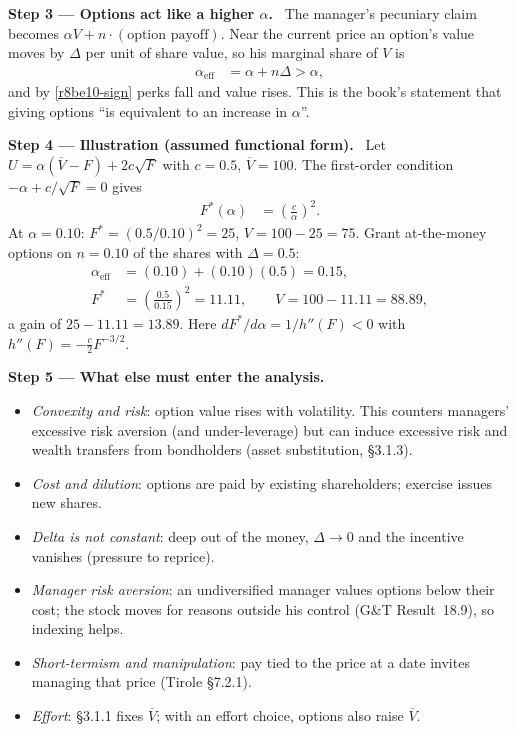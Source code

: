 \documentclass[11pt,a4paper]{article}
\newcommand{\step}[2]{\par\medskip\noindent\textbf{Step #1 --- #2.}~}
\begin{document}
\step{3}{Options act like a higher $\alpha$} The manager's pecuniary claim becomes $\alpha V + n\cdot(\text{option payoff})$. Near the current price an option's value moves by $\Delta$ per unit of share value, so his marginal share of $V$ is
\begin{align}
  \alpha_{\text{eff}} &= \alpha + n\Delta > \alpha, \label{r8be10-aeff}
\end{align}
and by \eqref{r8be10-sign} perks fall and value rises. This is the book's statement that giving options ``is equivalent to an increase in $\alpha$''.

\step{4}{Illustration (assumed functional form)} Let $U=\alpha(\overline V-F)+2c\sqrt F$ with $c=0.5$, $\overline V=100$. The first-order condition $-\alpha+c/\sqrt F=0$ gives
\begin{align}
  F^*(\alpha) &= \left(\frac{c}{\alpha}\right)^2. \label{r8be10-Fstar}
\end{align}
At $\alpha=0.10$: $F^*=(0.5/0.10)^2=25$, $V=100-25=75$. Grant at-the-money options on $n=0.10$ of the shares with $\Delta=0.5$:
\begin{align}
  \alpha_{\text{eff}} &= (0.10)+(0.10)(0.5) = 0.15, \nonumber\\
  F^* &= \left(\frac{0.5}{0.15}\right)^2 = 11.11, \qquad V = 100-11.11 = 88.89, \label{r8be10-num}
\end{align}
a gain of $25-11.11=13.89$. Here $dF^*/d\alpha=1/h''(F)<0$ with $h''(F)=-\tfrac{c}{2}F^{-3/2}$.

\step{5}{What else must enter the analysis}
\begin{itemize}
  \item \emph{Convexity and risk}: option value rises with volatility. This counters managers' excessive risk aversion (and under-leverage) but can induce excessive risk and wealth transfers from bondholders (asset substitution, \S3.1.3).
  \item \emph{Cost and dilution}: options are paid by existing shareholders; exercise issues new shares.
  \item \emph{Delta is not constant}: deep out of the money, $\Delta\to0$ and the incentive vanishes (pressure to reprice).
  \item \emph{Manager risk aversion}: an undiversified manager values options below their cost; the stock moves for reasons outside his control (G\&T Result~18.9), so indexing helps.
  \item \emph{Short-termism and manipulation}: pay tied to the price at a date invites managing that price (Tirole \S7.2.1).
  \item \emph{Effort}: \S3.1.1 fixes $\overline V$; with an effort choice, options also raise $\overline V$.
\end{itemize}
\end{document}

